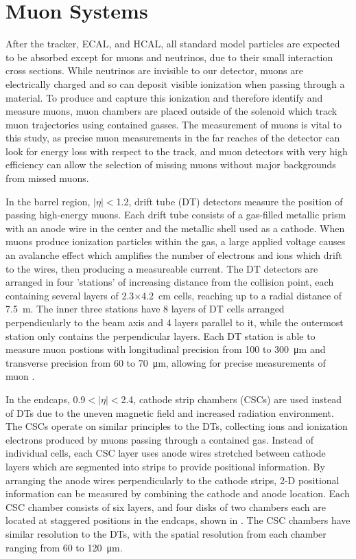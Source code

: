 \section{Muon Systems}
After the tracker, ECAL, and HCAL, all standard model particles are expected to be absorbed except for muons and neutrinos, due to their small interaction cross sections.
While neutrinos are invisible to our detector, muons are electrically charged and so can deposit visible ionization when passing through a material.
To produce and capture this ionization and therefore identify and measure muons, muon chambers are placed outside of the solenoid which track muon trajectories using contained gasses.
The measurement of muons is vital to this study, as precise muon measurements in the far reaches of the detector can look for energy loss with respect to the track, and muon detectors with very high efficiency can allow the selection of missing muons without major backgrounds from missed muons.

In the barrel region, $\lvert\eta\rvert<$1.2, drift tube (DT) detectors measure the position of passing high-energy muons. 
Each drift tube consists of a gas-filled metallic prism with an anode wire in the center and the metallic shell used as a cathode.
When muons produce ionization particles within the gas, a large applied voltage causes an avalanche effect which amplifies the number of electrons and ions which drift to the wires, then producing a measureable current.
The DT detectors are arranged in four 'stations' of increasing distance from the collision point, each containing several layers of 2.3$\times$\SI{4.2}{\centi\meter} cells, reaching up to a radial distance of \SI{7.5}{\meter}. 
The inner three stations have 8 layers of DT cells arranged perpendicularly to the beam axis and 4 layers parallel to it, while the outermost station only contains the perpendicular layers.
Each DT station is able to measure muon postions with longitudinal precision from 100 to \SI{300}{\micro\meter} and transverse precision from  60 to \SI{70}{\micro\meter}, allowing for precise measurements of muon \pt. 

In the endcaps, 0.9$<\lvert\eta\rvert<$2.4, cathode strip chambers (CSCs) are used instead of DTs due to the uneven magnetic field and increased radiation environment.
The CSCs operate on similar principles to the DTs, collecting ions and ionization electrons produced by muons passing through a contained gas. 
Instead of individual cells, each CSC layer uses anode wires stretched between cathode layers which are segmented into strips to provide positional information. 
By arranging the anode wires perpendicularly to the cathode strips, 2-D positional information can be measured by combining the cathode and anode location. 
Each CSC chamber consists of six layers, and four disks of two chambers each are located at staggered positions in the endcaps, shown in . 
The CSC chambers have similar resolution to the DTs, with the spatial resolution from each chamber ranging from 60 to \SI{120}{\micro\meter}.

